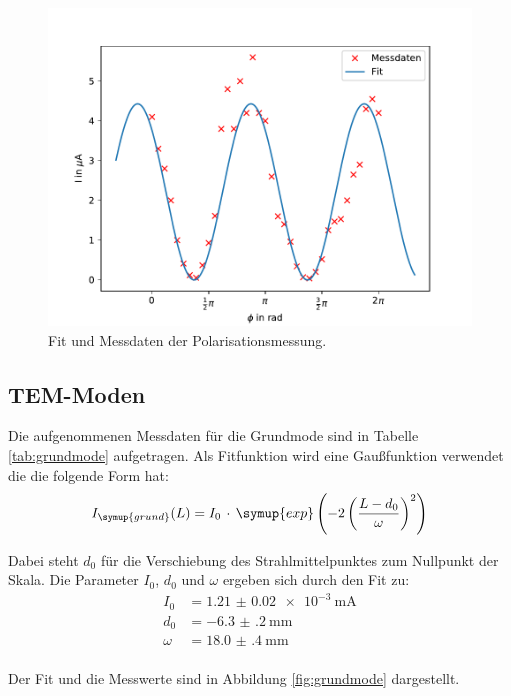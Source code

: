 \begin{figure}[H]
  \centering
  \includegraphics{polarisation.pdf}
  \caption{Fit und Messdaten der Polarisationsmessung.}
  \label{fig:polarisation}
\end{figure}

\subsection{TEM-Moden}

Die aufgenommenen Messdaten für die Grundmode sind in Tabelle \ref{tab:grundmode} aufgetragen.
Als Fitfunktion wird eine Gaußfunktion verwendet die die folgende Form hat:
\begin{align}
  I_{\symup{grund}}(L) = I_0\,\cdot\,\symup{exp}\left(-2\left(\frac{L-d_0}{\omega}\right)^2\right)
\end{align}

Dabei steht $d_0$ für die Verschiebung des Strahlmittelpunktes zum Nullpunkt der Skala.
Die Parameter $I_0$, $d_0$ und $\omega$ ergeben sich durch den Fit zu:
\begin{align}
  I_0 &= \SI{1.21(2)e-3}{\milli\ampere}\\
  d_0 &= \SI{-6.3(2)}{\milli\meter}\\
  \omega &= \SI{18.0(4)}{\milli\meter}\\
\end{align}

Der Fit und die Messwerte sind in Abbildung \ref{fig:grundmode} dargestellt.

